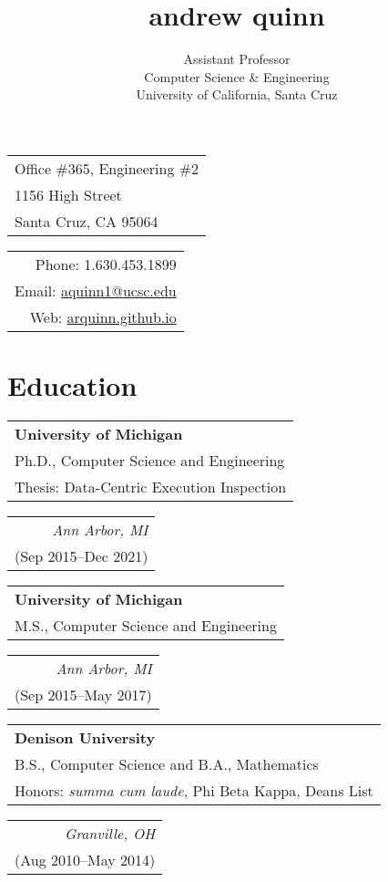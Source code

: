 \documentclass[letterpaper,10pt]{article}
\title{andrew quinn}
\author{Assistant Professor\\Computer Science \& Engineering\\ University of California, Santa Cruz}
\makeatletter
\newcommand{\reitem}[2]{
  \begin{tabular}[t]{l}
    #2
  \end{tabular}
\hfill
\begin{tabular}[t]{r}
  #1
\end{tabular}
}
\newcommand{\quadItem}[4]{\reitem{\emph{#1}\\#2}{\textbf{#3}\\#4}}
\def \addr {Office \#365, Engineering \#2\\1156 High Street\\Santa Cruz, CA 95064}
\def \phone {1.630.453.1899}
\def \email {\href{mailto:aquinn1@ucsc.edu}{aquinn1@ucsc.edu}}
\def \website {\href{https://arquinn.github.io}{arquinn.github.io}}
\makeatother
\begin{document}
\maketitle
\setlength\parindent{0pt}
\setlength{\parskip}{3pt}


\begin{tabular}[t]{l}
  \addr
\end{tabular}
\hfill
\begin{tabular}[t]{r}
  Phone: \phone\\
  Email: \email\\
  Web: \website
\end{tabular}



\section{Education}
\quadItem{Ann Arbor, MI}{(Sep 2015--Dec 2021)}{University of
  Michigan}{Ph.D., Computer Science and Engineering\\Thesis:
  Data-Centric Execution Inspection}
\quadItem{Ann Arbor, MI}{(Sep 2015--May 2017)}{University of Michigan}{M.S.,
  Computer Science and Engineering}
\quadItem{Granville, OH}{(Aug 2010--May 2014)}{Denison University}{B.S.,
  Computer Science and B.A., Mathematics\\ Honors: \textit{summa cum
    laude}, Phi Beta Kappa, Deans List}
\end{document}
